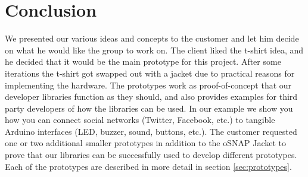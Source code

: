 \newpage

\section{Conclusion}
We presented our various ideas and concepts to the customer and let him decide on what he would
like the group to work on. The client liked the t-shirt idea, and he decided that it would be the main prototype for this project. 
After some iterations the t-shirt got swapped out with a jacket due to practical reasons for implementing the hardware. 
The prototypes work as proof-of-concept that our developer libraries function as they should, and also provides examples for third party developers of how the libraries can be used. In our example we show you how you can connect social networks (Twitter, Facebook, etc.) to 
tangible Arduino interfaces (LED, buzzer, sound, buttons, etc.). The customer requested one or two additional smaller prototypes in 
addition to the oSNAP Jacket to prove that our libraries can be successfully used to develop different prototypes. Each of the prototypes are 
described in more detail in section \ref{sec:prototypes}.
